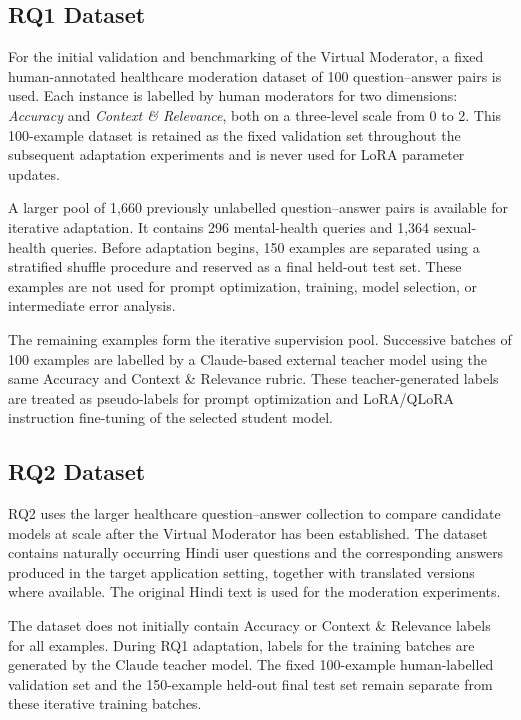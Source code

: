 \documentclass[11pt,a4paper]{article}
\begin{document}
\subsection{RQ1 Dataset}
For the initial validation and benchmarking of the Virtual Moderator, a fixed
human-annotated healthcare moderation dataset of 100 question--answer pairs is
used. Each instance is labelled by human moderators for two dimensions:
\emph{Accuracy} and \emph{Context \& Relevance}, both on a three-level scale
from 0 to 2. This 100-example dataset is retained as the fixed validation set
throughout the subsequent adaptation experiments and is never used for LoRA
parameter updates.

A larger pool of 1{,}660 previously unlabelled question--answer pairs is
available for iterative adaptation. It contains 296 mental-health queries and
1{,}364 sexual-health queries. Before adaptation begins, 150 examples are
separated using a stratified shuffle procedure and reserved as a final
held-out test set. These examples are not used for prompt optimization,
training, model selection, or intermediate error analysis.

The remaining examples form the iterative supervision pool. Successive batches
of 100 examples are labelled by a Claude-based external teacher model using
the same Accuracy and Context \& Relevance rubric. These teacher-generated
labels are treated as pseudo-labels for prompt optimization and LoRA/QLoRA
instruction fine-tuning of the selected student model.

\subsection{RQ2 Dataset}
RQ2 uses the larger healthcare question--answer collection to compare candidate
models at scale after the Virtual Moderator has been established. The dataset
contains naturally occurring Hindi user questions and the corresponding
answers produced in the target application setting, together with translated
versions where available. The original Hindi text is used for the moderation
experiments.

The dataset does not initially contain Accuracy or Context \& Relevance labels
for all examples. During RQ1 adaptation, labels for the training batches are
generated by the Claude teacher model. The fixed 100-example human-labelled
validation set and the 150-example held-out final test set remain separate from
these iterative training batches.
\end{document}
